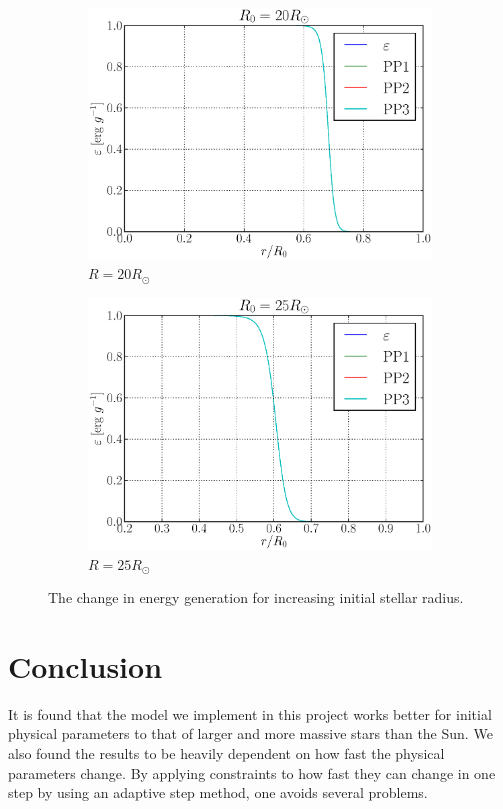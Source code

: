 \documentclass[a4paper, 11pt, english]{article}
\begin{document}
\begin{figure}[htpb]
\begin{subfigure}{0.49\textwidth}
		\includegraphics[width=\linewidth]{figures/energy_20Rsun.eps}
		\caption{$R = 20R_{\odot}$}
		\label{fig:energy_20Rsun}
	\end{subfigure}\hfill
	\begin{subfigure}{0.49\textwidth}
		\includegraphics[width=\linewidth]{figures/energy_25Rsun.eps}
		\caption{$R = 25R_{\odot}$}
		\label{fig:energy_25Rsun}
	\end{subfigure}
	\vspace{0.2cm}
	\caption{The change in energy generation for increasing initial stellar radius.}
	\label{fig:energy_change}
\end{figure}

\section{Conclusion}
It is found that the model we implement in this project works better for initial physical
parameters to that of larger and more massive stars than the Sun. We also found the
results to be heavily dependent on how fast the physical parameters change. By applying
constraints to how fast they can change in one step by using an adaptive step method, one
avoids several problems.
\end{document}
